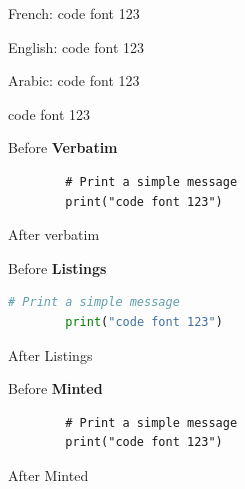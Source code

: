 \documentclass{article}
\begin{document}
    \begin{otherlanguage}{french}
        French:
        \ttfamily code font 123
    \end{otherlanguage}



    \begin{otherlanguage}{english}
        English:
        \ttfamily code font 123
    \end{otherlanguage}



    \begin{otherlanguage}{arabic}
        Arabic:
        \ttfamily code font 123
    \end{otherlanguage}




     \egroup



    Before \textbf{Verbatim}
    \begin{verbatim}
        # Print a simple message
        print("code font 123")
    \end{verbatim}
    After verbatim





    Before \textbf{Listings}
    \begin{lstlisting}[language=Python,
        basicstyle=\ttfamily,
        commentstyle=\itshape\color{pycomment},
        keywordstyle=\color{pykeyword},
        stringstyle=\color{pystring},
        showstringspaces=false,
        breaklines=true]
        # Print a simple message
        print("code font 123")
    \end{lstlisting}
    After Listings



    Before \textbf{Minted}
    \begin{verbatim}
        # Print a simple message
        print("code font 123")
    \end{verbatim}
    After Minted
\end{document}
